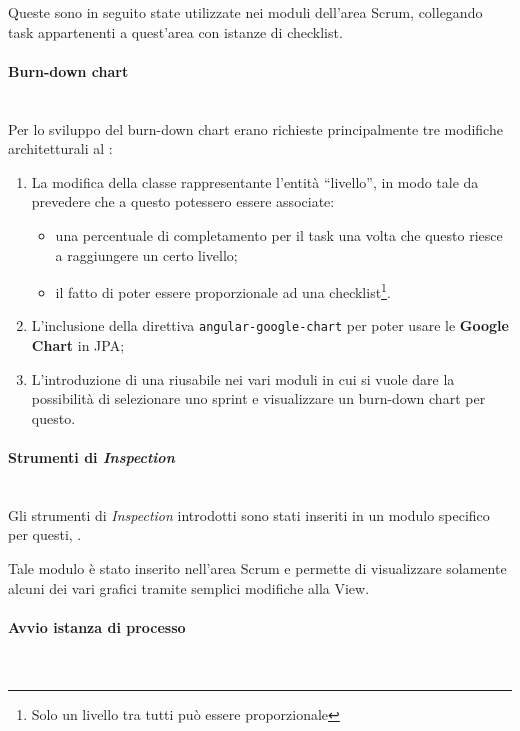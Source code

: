 Queste  sono in seguito state utilizzate nei moduli
dell'area Scrum, collegando task appartenenti a quest'area con istanze di
checklist.

\paragraph{Burn-down chart} \mbox{} \\

Per lo sviluppo del burn-down chart erano richieste principalmente tre
modifiche architetturali al \FREND:

\begin{enumerate}
\item La modifica della classe rappresentante l'entità ``livello'', in modo 
  tale da prevedere che a questo potessero essere associate:
  \begin{itemize}
  \item una percentuale di completamento per il task una volta che questo
    riesce a raggiungere un certo livello;
  \item il fatto di poter essere proporzionale ad una checklist\footnote{Solo
    un livello tra tutti può essere proporzionale}.
  \end{itemize}
\item L'inclusione della direttiva \texttt{angular-google-chart} per poter
  usare le \textbf{Google Chart } in JPA;
\item L'introduzione di una  riusabile nei vari moduli in cui si
  vuole dare la possibilità di selezionare uno sprint e visualizzare un
  burn-down chart per questo.
\end{enumerate}

\paragraph{Strumenti di \emph{Inspection}} \mbox{} \\

Gli strumenti di \emph{Inspection} introdotti sono stati inseriti in un modulo
specifico per questi, .

Tale modulo è stato inserito nell'area Scrum e permette di visualizzare
solamente alcuni dei vari grafici tramite semplici modifiche alla View.

\paragraph{Avvio istanza di processo} \mbox{} \\


